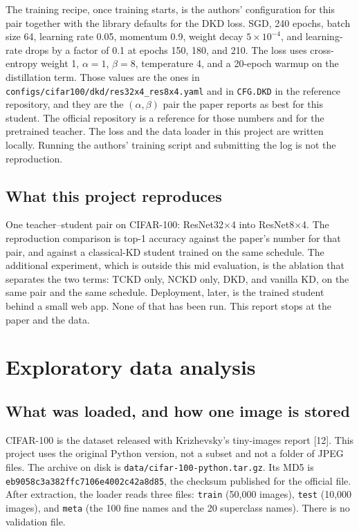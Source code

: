 \documentclass[11pt]{article}
\begin{document}
The training recipe, once training starts, is the authors' configuration for this pair together with the library defaults for the DKD loss. SGD, 240 epochs, batch size 64, learning rate 0.05, momentum 0.9, weight decay \(5 \times 10^{-4}\), and learning-rate drops by a factor of 0.1 at epochs 150, 180, and 210. The loss uses cross-entropy weight 1, \(\alpha = 1\), \(\beta = 8\), temperature 4, and a 20-epoch warmup on the distillation term. Those values are the ones in \texttt{configs/cifar100/dkd/res32x4\_res8x4.yaml} and in \texttt{CFG.DKD} in the reference repository, and they are the \((\alpha, \beta)\) pair the paper reports as best for this student. The official repository is a reference for those numbers and for the pretrained teacher. The loss and the data loader in this project are written locally. Running the authors' training script and submitting the log is not the reproduction.

\subsection{What this project reproduces}

One teacher--student pair on CIFAR-100: ResNet32\(\times\)4 into ResNet8\(\times\)4. The reproduction comparison is top-1 accuracy against the paper's number for that pair, and against a classical-KD student trained on the same schedule. The additional experiment, which is outside this mid evaluation, is the ablation that separates the two terms: TCKD only, NCKD only, DKD, and vanilla KD, on the same pair and the same schedule. Deployment, later, is the trained student behind a small web app. None of that has been run. This report stops at the paper and the data.

\section{Exploratory data analysis}
\label{sec:eda}

\subsection{What was loaded, and how one image is stored}

CIFAR-100 is the dataset released with Krizhevsky's tiny-images report [12]. This project uses the original Python version, not a subset and not a folder of JPEG files. The archive on disk is \texttt{data/cifar-100-python.tar.gz}. Its MD5 is \texttt{eb9058c3a382ffc7106e4002c42a8d85}, the checksum published for the official file. After extraction, the loader reads three files: \texttt{train} (50{,}000 images), \texttt{test} (10{,}000 images), and \texttt{meta} (the 100 fine names and the 20 superclass names). There is no validation file.
\end{document}
